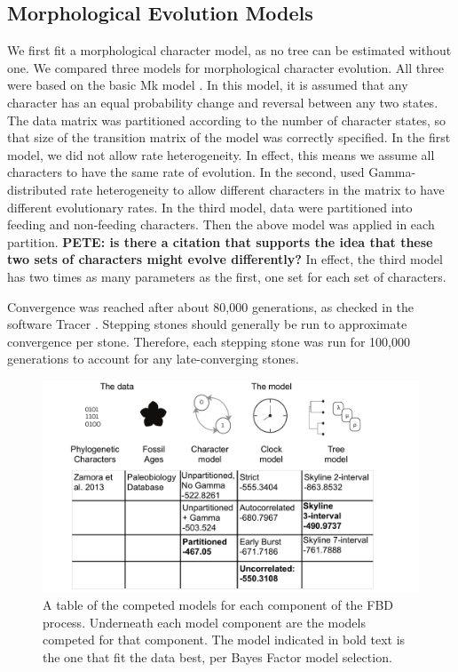 \documentclass{article}
\begin{document}
\subsection{Morphological Evolution Models}
We first fit a morphological character model, as no tree can be estimated without one.
We compared three models for morphological character evolution. 
All three were based on the basic Mk model \citep{Lewis2001}. 
In this model, it is assumed that any character has an equal probability change and reversal between any two states. 
The data matrix was partitioned according to the number of character states, so that size of the transition matrix of the model was correctly specified.
In the first model, we did not allow rate heterogeneity. 
In effect, this means we assume all characters to have the same rate of evolution.
In the second, used Gamma-distributed rate heterogeneity to allow different characters in the matrix to have different evolutionary rates.
In the third model, data were partitioned into feeding and non-feeding characters.
Then the above model was applied in each partition. \textbf{PETE: is there a citation that supports the idea that these two sets of characters might evolve differently?}
In effect, the third model has two times as many parameters as the first, one set for each set of characters.

Convergence was reached after about 80,000 generations, as checked in the software Tracer \citep{Rambaut2018}. 
Stepping stones should generally be run to approximate convergence per stone.
Therefore, each stepping stone was run for 100,000 generations to account for any late-converging stones.

\begin{figure}
  \includegraphics[width=\textwidth]{figures/Fig1.pdf}

  \caption{A table of the competed models for each component of the FBD process. Underneath each model component are the models competed for that component. The model indicated in bold text is the one that fit the data best, per Bayes Factor model selection.}
\end{figure}
\end{document}
